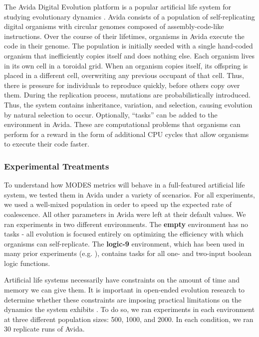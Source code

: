\documentclass[letterpaper]{article}
\begin{document}
The Avida Digital Evolution platform is a popular artificial life system for studying evolutionary dynamics \citep{ofria_avida:_2004}. Avida consists of a population of self-replicating digital organisms with circular genomes composed of assembly-code-like instructions. Over the course of their lifetimes, organisms in Avida execute the code in their genome. The population is initially seeded with a single hand-coded organism that inefficiently copies itself and does nothing else. Each organism lives in its own cell in a toroidal grid. When an organism copies itself, its offspring is placed in a different cell, overwriting any previous occupant of that cell. Thus, there is pressure for individuals to reproduce quickly, before others copy over them. During the replication process, mutations are probabilistically introduced. Thus, the system contains inheritance, variation, and selection, causing evolution by natural selection to occur. Optionally, ``tasks'' can be added to the environment in Avida. These are computational problems that organisms can perform for a reward in the form of additional CPU cycles that allow organisms to execute their code faster.

\subsubsection{Experimental Treatments}
To understand how MODES metrics will behave in a full-featured artificial life system, we tested them in Avida under a variety of scenarios. For all experiments, we used a well-mixed population in order to speed up the expected rate of coalescence. All other parameters in Avida were left at their default values. We ran experiments in two different environments. The \textbf{empty} environment has no tasks - all evolution is focused entirely on optimizing the efficiency with which organisms can self-replicate. The \textbf{logic-9} environment, which has been used in many prior experiments (e.g. \citep{lenski_evolutionary_2003}), contains tasks for all one- and two-input boolean logic functions.

Artificial life systems necessarily have constraints on the amount of time and memory we can give them. It is important in open-ended evolution research to determine whether these constraints are imposing practical limitations on the dynamics the system exhibits \citep{zaman_investigating_2018}. To do so, we ran experiments in each environment at three different population sizes: 500, 1000, and 2000. In each condition, we ran 30 replicate runs of Avida.
\end{document}
